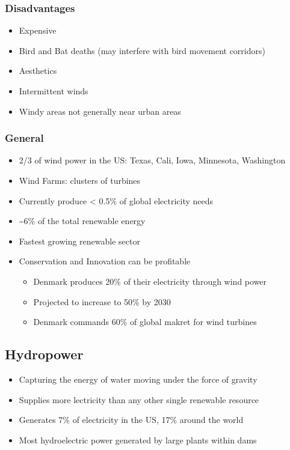\documentclass[11pt]{article}
\begin{document}
\subsubsection{Disadvantages}
\label{sec:orgc2e3497}
\begin{itemize}
\item Expensive
\item Bird and Bat deaths (may interfere with bird movement corridors)
\item Aesthetics
\item Intermittent winds
\item Windy areas not generally near urban areas
\end{itemize}
\subsubsection{General}
\label{sec:org65171df}
\begin{itemize}
\item 2/3 of wind power in the US: Texas, Cali, Iowa, Minnesota, Washington
\item Wind Farms: clusters of turbines
\item Currently produce < 0.5\% of global electricity needs
\item \textasciitilde{}6\% of the total renewable energy
\item Fastest growing renewable sector
\item Conservation and Innovation can be profitable
\begin{itemize}
\item Denmark produces 20\% of their electricity through wind power
\item Projected to increase to 50\% by 2030
\item Denmark commands 60\% of global makret for wind turbines
\end{itemize}
\end{itemize}
\subsection{Hydropower}
\label{sec:orgb204eef}
\begin{itemize}
\item Capturing the energy of water moving under the force of gravity
\item Supplies more lectricity than any other single renewable resource
\item Generates 7\% of electricity in the US, 17\% around the world
\item Most hydroelectric power generated by large plants within dams
\end{itemize}
\end{document}
